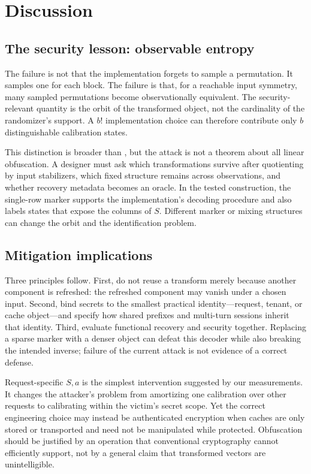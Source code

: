 \section{Discussion}
\label{sec:discussion}
\subsection{The security lesson: observable entropy}
The failure is not that the implementation forgets to sample a permutation. It samples one for each block. The failure is that, for a reachable input symmetry, many sampled permutations become observationally equivalent. The security-relevant quantity is the orbit of the transformed object, not the cardinality of the randomizer's support. A $b!$ implementation choice can therefore contribute only $b$ distinguishable calibration states.

This distinction is broader than \scheme{}, but the attack is not a theorem about all linear obfuscation. A designer must ask which transformations survive after quotienting by input stabilizers, which fixed structure remains across observations, and whether recovery metadata becomes an oracle. In the tested construction, the single-row marker supports the implementation's decoding procedure and also labels states that expose the columns of $S$. Different marker or mixing structures can change the orbit and the identification problem.

\subsection{Mitigation implications}
Three principles follow. First, do not reuse a transform merely because another component is refreshed: the refreshed component may vanish under a chosen input. Second, bind secrets to the smallest practical identity---request, tenant, or cache object---and specify how shared prefixes and multi-turn sessions inherit that identity. Third, evaluate functional recovery and security together. Replacing a sparse marker with a denser object can defeat this decoder while also breaking the intended inverse; failure of the current attack is not evidence of a correct defense.

Request-specific $S,a$ is the simplest intervention suggested by our measurements. It changes the attacker's problem from amortizing one calibration over other requests to calibrating within the victim's secret scope. Yet the correct engineering choice may instead be authenticated encryption when caches are only stored or transported and need not be manipulated while protected. Obfuscation should be justified by an operation that conventional cryptography cannot efficiently support, not by a general claim that transformed vectors are unintelligible.

